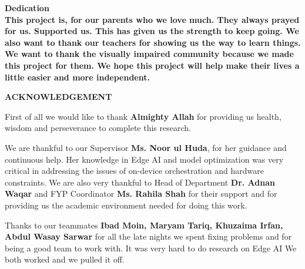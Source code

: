 \documentclass[12pt,a4paper]{report}
\begin{document}
\clearpage
\pagestyle{logoheader}
\thispagestyle{logoheader}

\begin{center}
    \vspace{1cm}
    {\Large  \textbf{Dedication}}\\
    \vspace{5cm}
    \textbf{This project is, for our parents who we love much. They always prayed for us. Supported us. This has given us the strength to keep going. We also want to thank our teachers for showing us the way to learn things. We want to thank the visually impaired community because we made this project for them. We hope this project will help make their lives a little easier and more independent.}
\end{center}

\vspace{0.8cm}


\clearpage
\pagestyle{logoheader}
\thispagestyle{logoheader}

\begin{center}
    \vspace{1cm}
    {\Large \textbf{ACKNOWLEDGEMENT}}\\
    \vspace{1cm}
    
\end{center}
    

\noindent First of all we would like to thank \textbf{Almighty Allah} for providing us health, wisdom and perseverance to complete this research.

\noindent We are thankful to our Supervisor \textbf{Ms. Noor ul Huda}, for her guidance and continuous help. Her knowledge in Edge AI and model optimization was very critical in addressing the issues of on-device orchestration and hardware constraints. We are also very thankful to Head of Department \textbf{Dr. Adnan Waqar} and FYP Coordinator \textbf{Ms. Rahila Shah} for their support and for providing us the academic environment needed for doing this work.

\noindent Thanks to our teammates \textbf{Ibad Moin, Maryam Tariq, Khuzaima Irfan, Abdul Wasay Sarwar} for all the late nights we spent fixing problems and for being a good team to work with. It was very hard to do research on Edge AI We both worked and we pulled it off.
\end{document}
